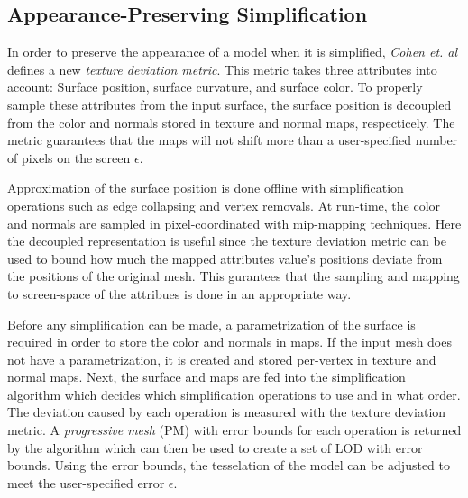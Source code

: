 \subsection{Appearance-Preserving Simplification} \label{sec:appearance-preserving_simplification}
In order to preserve the appearance of a model when it is simplified, \emph{Cohen et. al} \cite{cohen1998appearance} defines a new \emph{texture deviation metric}. This metric takes three attributes into account: Surface position, surface curvature, and surface color. To properly sample these attributes from the input surface, the surface position is decoupled from the color and normals stored in texture and normal maps, respecticely. The metric guarantees that the maps will not shift more than a user-specified number of pixels on the screen $\epsilon$.

Approximation of the surface position is done offline with simplification operations such as edge collapsing and vertex removals. At run-time, the color and normals are sampled in pixel-coordinated with mip-mapping techniques. Here the decoupled representation is useful since the texture deviation metric can be used to bound how much the mapped attributes value's positions deviate from the positions of the original mesh. This gurantees that the sampling and mapping to screen-space of the attribues is done in an appropriate way.

Before any simplification can be made, a parametrization of the surface is required in order to store the color and normals in maps. If the input mesh does not have a parametrization, it is created and stored per-vertex in texture and normal maps. Next, the surface and maps are fed into the simplification algorithm which decides which simplification operations to use and in what order. The deviation caused by each operation is measured with the texture deviation metric. A \emph{progressive mesh} (PM) with error bounds for each operation is returned by the algorithm which can then be used to create a set of LOD with error bounds. Using the error bounds, the tesselation of the model can be adjusted to meet the user-specified error $\epsilon$.

